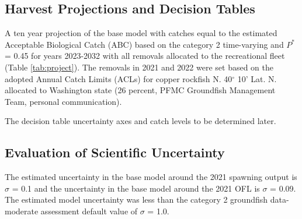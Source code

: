\documentclass[11pt,
  english,
  a4paper,
]{article}
\begin{document}
\leavevmode\tagmcend\tagstructend\par


\hypertarget{harvest-projections-and-decision-tables}{%
\subsection{Harvest Projections and Decision Tables}\label{harvest-projections-and-decision-tables}}

\leavevmode\tagmcend\tagstructend


A ten year projection of the base model with catches equal to the estimated Acceptable Biological Catch (ABC) based on the category 2 time-varying and {\(P^*\)\leavevmode\tagmcend\tagstructend} = 0.45 for years 2023-2032 with all removals allocated to the recreational fleet (Table \ref{tab:project}). The removals in 2021 and 2022 were set based on the adopted Annual Catch Limits (ACLs) for copper rockfish N. 40{\(^\circ\)\leavevmode\tagmcend\tagstructend} 10' Lat. N. allocated to Washington state (26 percent, PFMC Groundfish Management Team, personal communication).

\leavevmode\tagmcend\tagstructend\par


The decision table uncertainty axes and catch levels to be determined later.

\leavevmode\tagmcend\tagstructend\par


\hypertarget{evaluation-of-scientific-uncertainty}{%
\subsection{Evaluation of Scientific Uncertainty}\label{evaluation-of-scientific-uncertainty}}

\leavevmode\tagmcend\tagstructend


The estimated uncertainty in the base model around the 2021 spawning output is {\(\sigma\)\leavevmode\tagmcend\tagstructend} = 0.1 and the uncertainty in the base model around the 2021 OFL is {\(\sigma\)\leavevmode\tagmcend\tagstructend} = 0.09. The estimated model uncertainty was less than the category 2 groundfish data-moderate assessment default value of {\(\sigma\)\leavevmode\tagmcend\tagstructend} = 1.0.
\end{document}
